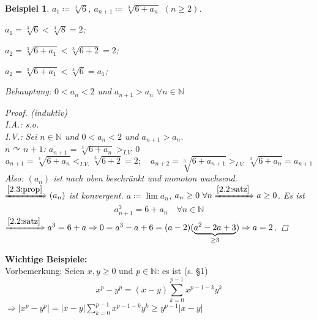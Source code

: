 \documentclass[14pt,titlepage,ngerman,a4paper,headsepline,DIV15,halfparskip*]{scrartcl}
\newcommand{\N}{\mathbb{N}}
\theoremstyle{named}
\theoremstyle{dotless}
\newtheorem*{beispiel*}{Beispiel}
\begin{document}
\begin{beispiel*} $a_{1} \coloneqq \sqrt[3]{6}$, $a_{n + 1} \coloneqq \sqrt[3]{6 + a_{n}}$ $(n \geq 2)$.
	\begin{description}
		\item $a_{1} = \sqrt[3]{6} < \sqrt[3]{8} = 2$;
		\item $a_{2} = \sqrt[3]{6 + a_{1}} < \sqrt[3]{6 + 2} = 2$;
		\item $a_{2} = \sqrt[3]{6 + a_{1}} < \sqrt[3]{6} = a_{1}$;
	\end{description}
	Behauptung: $0 < a_{n} < 2$ und $a_{n + 1} > a_{n}$ $\forall n \in \N$

	\begin{proof}(induktiv) \\
		I.A.: s.o. \\
		I.V.: Sei $n \in \N$ und $0 < a_{n} < 2$ und $a_{n+1} > a_{n}$. \\
		$n \curvearrowright n + 1$: $a_{n + 1} = \sqrt[3]{6 + a_{n}} >_{I.V.} 0$
		$$
			a_{n +1} = \sqrt[3]{6 + a_{n}} <_{I.V.} \sqrt[3]{6 + 2} = 2; \quad a_{n + 2} = \sqrt[3]{6 + a_{n+1}} >_{I.V.} \sqrt[3]{6 + a_{n}} = a_{n + 1}
		$$
		Also: $(a_{n})$ ist nach oben beschränkt und monoton wachsend. \\
		$\xRightarrow[]{\ref{2.3:prop}} (a_{n})$ ist konvergent. $a \coloneqq \lim a_{n}$, $a_{n} \geq 0 ~\forall n \xRightarrow[]{\ref{2.2:satz}} a \geq 0$. Es ist
		$$
			a_{n+1}^{3} = 6 + a_{n} \quad \forall n \in \N
		$$
		$\xRightarrow[]{\ref{2.2:satz}} a^{3} = 6 + a \Rightarrow 0 = a^{3} - a + 6 = (a-2)(\underbrace{a^{2}-2a+3}_{\geq 3}) \Rightarrow a = 2$.
	\end{proof}
\end{beispiel*}


\textbf{Wichtige Beispiele:} \\

Vorbemerkung: Seien $x, y \geq 0$ und $p \in \N$: es ist (s. \S 1)
$$
	x^{p} - y^{p} = (x - y) \sum_{k = 0}^{p-1} x^{p-1-k}y^{k}
$$
$\Rightarrow |x^{p} - y^{p}| = |x-y| \sum_{k=0}^{p-1} x^{p-1-k}y^{k} \geq y^{p-1} |x - y|$
\newline
\end{document}

